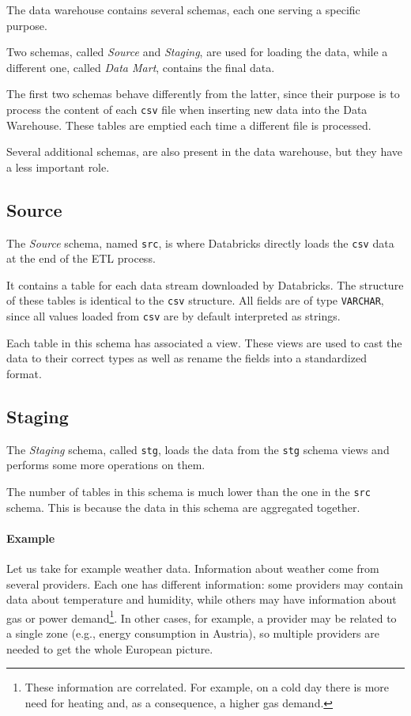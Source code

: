 The data warehouse contains several schemas, each one serving a specific purpose.

Two schemas, called \textit{Source} and \textit{Staging}, are used for loading the data, while a different one, called \textit{Data Mart}, contains the final data.

The first two schemas behave differently from the latter, since their purpose is to process the content of each \texttt{csv} file when inserting new data into the Data Warehouse.
These tables are emptied each time a different file is processed.

Several additional schemas, are also present in the data warehouse, but they have a less important role.

\subsection{Source}
    The \textit{Source} schema, named \texttt{src}, is where Databricks directly loads the \texttt{csv} data at the end of the ETL process.
    
    It contains a table for each data stream downloaded by Databricks.
    The structure of these tables is identical to the \texttt{csv} structure.
    All fields are of type \texttt{VARCHAR}, since all values loaded from \texttt{csv} are by default interpreted as strings.
    
    Each table in this schema has associated a view.
    These views are used to cast the data to their correct types as well as rename the fields into a standardized format.
        
\subsection{Staging}
    The \textit{Staging} schema, called \texttt{stg}, loads the data from the \texttt{stg} schema views and performs some more operations on them.
    
    The number of tables in this schema is much lower than the one in the \texttt{src} schema.
    This is because the data in this schema are aggregated together.
    
    \paragraph{Example}
        Let us take for example weather data.
        Information about weather come from several providers.
        Each one has different information: some providers may contain data about temperature and humidity, while others may have information about gas or power demand\footnote{
            These information are correlated.
            For example, on a cold day there is more need for heating and, as a consequence, a higher gas demand.
        }.
        In other cases, for example, a provider may be related to a single zone (e.g., energy consumption in Austria), so multiple providers are needed to get the whole European picture.\\
    
